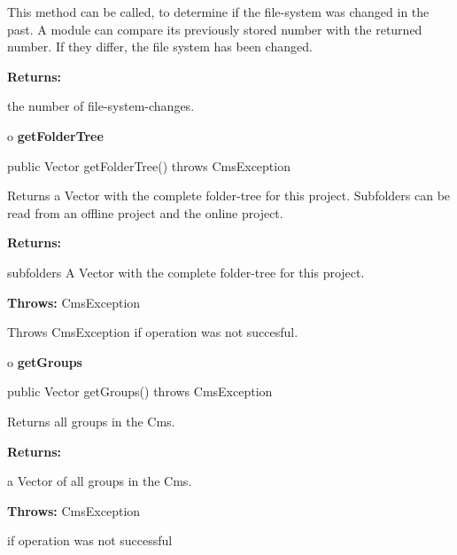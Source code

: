 \begin{description}
\htmlDD This method can be called, to determine if the file-system was changed
in the past. \htmlBR
A module can compare its previously stored number with the returned number. If
they differ, the file system has been changed.

\begin{description}
\item {\bf Returns:}

the number of file-system-changes.
\end{description}

\end{description}

o {\bf getFolderTree}

\begin{PRE}
 public Vector getFolderTree() throws CmsException
\end{PRE}

\begin{description}
\htmlDD Returns a Vector with the complete folder-tree for this
project.\htmlBR
Subfolders can be read from an offline project and the online project. \htmlBR

\begin{description}
\item {\bf Returns:}

subfolders A Vector with the complete folder-tree for this project.
\item {\bf Throws:} CmsException

Throws CmsException if operation was not succesful.
\end{description}

\end{description}

o {\bf getGroups}

\begin{PRE}
 public Vector getGroups() throws CmsException
\end{PRE}

\begin{description}
\htmlDD Returns all groups in the Cms.

\begin{description}
\item {\bf Returns:}

a Vector of all groups in the Cms.
\item {\bf Throws:} CmsException

if operation was not successful
\end{description}

\end{description}

